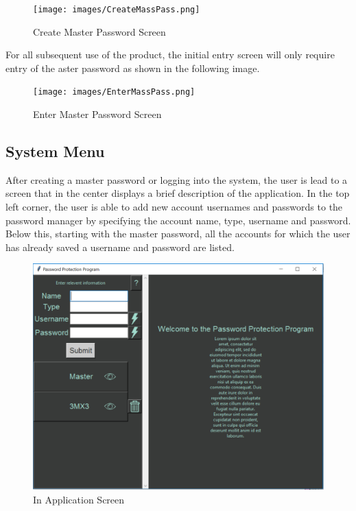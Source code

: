 \documentclass[12pt, titlepage]{article}
\begin{document}
\begin{figure}[h]
	\texttt{[image: images/CreateMassPass.png]}
	\caption{Create Master Password Screen}
	\label{fig:crMasPass}
\end{figure}

For all subsequent use of the product, the initial entry screen will only require entry of the aster password as shown in the following image.

\begin{figure}[h]
	\texttt{[image: images/EnterMassPass.png]}
	\caption{Enter Master Password Screen}
	\label{fig:enMasPass}
\end{figure}


\subsection{System Menu} \label{SysMenu}

After creating a master password or logging into the system, the user is lead to a screen that in the center displays a brief description of the application. In the top left corner, the user is able to add new account usernames and passwords to the password manager by specifying the account name, type, username and password.
Below this, starting with the master password, all the accounts for which the user has already saved a username and password are listed. 


\begin{figure}[h]
	\includegraphics[scale=0.3]{images/InAppScreen.png}
	\caption{In Application Screen}
	\label{fig:InApp}
\end{figure}
\end{document}
